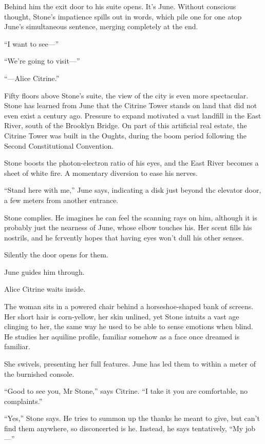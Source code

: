 Behind him the exit door to his suite opens. It's June. Without conscious thought, Stone's impatience spills out in words, which pile one for one atop June's simultaneous sentence, merging completely at the end.

``I want to see---''

``We're going to visit---''

``---Alice Citrine.''

Fifty floors above Stone's suite, the view of the city is even more spectacular. Stone has learned from June that the Citrine Tower stands on land that did not even exist a century ago. Pressure to expand motivated a vast landfill in the East River, south of the Brooklyn Bridge. On part of this artificial real estate, the Citrine Tower was built in the Oughts, during the boom period following the Second Constitutional Convention.

Stone boosts the photon-electron ratio of his eyes, and the East River becomes a sheet of white fire. A momentary diversion to ease his nerves.

``Stand here with me,'' June says, indicating a disk just beyond thc elevator door, a few meters from another entrance.

Stone complies. He imagines he can feel the scanning rays on him, although it is probably just the nearness of June, whose elbow touches his. Her scent fills his nostrils, and he fcrvently hopes that having eyes won't dull his other senses.

Silently the door opens for them.

June guides him through.

Alice Citrine waits inside.

The woman sits in a powered chair behind a horseshoe-shaped bank of screens. Her short hair is corn-yellow, her skin unlined, yet Stone intuits a vast age clinging to her, the same way he used to be able to sense emotions when blind. He studies her aquiline profile, familiar somehow as a face once dreamed is familiar.

She swivels, presenting her full features. June has led them to within a meter of the burnished console.

``Good to see you, Mr Stone,'' says Citrine. ``I take it you are comfortable, no complaints.''

``Yes,'' Stone says. He tries to summon up the thanks he meant to give, but can't find them anywhere, so disconcerted is he. Instead, he says tentatively, ``My job---''

